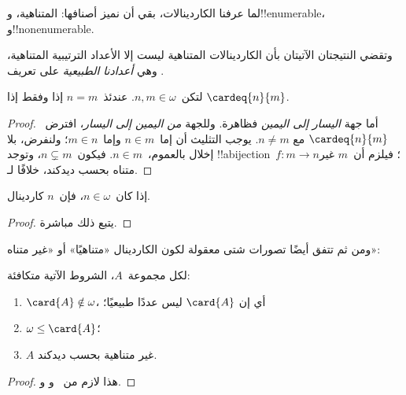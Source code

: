 \documentclass[../../../include/open-logic-section]{subfiles}
\begin{document}

لما عرفنا الكاردينالات، بقي أن نميز أصنافها: المتناهية،
و!!{enumerable}، و!!{nonenumerable}.

وتقضي النتيجتان الآتيتان بأن الكاردينالات المتناهية ليست إلا الأعداد
الترتيبية المتناهية، وهي \emph{أعدادنا الطبيعية} على تعريف
.

\begin{prop}
لتكن~$n, m \in \omega$. عندئذ~$n = m$ إذا وفقط إذا
$\cardeq{n}{m}$.
\end{prop}

\begin{proof}
أما جهة \emph{اليسار إلى اليمين} فظاهرة. وللجهة
\emph{من اليمين إلى اليسار}، افترض~$\cardeq{n}{m}$ مع
$n \neq m$. يوجب التثليث أن إما~$n \in m$ وإما~$m \in n$؛ ولنفرض،
بلا إخلال بالعموم،~$n \in m$. فيكون~$n \subsetneq m$، وتوجد
!!a{bijection}~$f \colon m \to n$؛ فيلزم أن~$m$ غير متناه بحسب
ديدكند، خلافًا لـ.
\end{proof}

\begin{cor}
إذا كان~$n \in \omega$، فإن~$n$ كاردينال.
\end{cor}

\begin{proof}
يتبع ذلك مباشرة.
\end{proof}
\noindent
ومن ثم تتفق أيضًا تصورات شتى معقولة لكون الكاردينال «متناهيًا» أو
«غير متناه»:
\begin{thm}لكل مجموعة~$A$، الشروط الآتية متكافئة:
\begin{enumerate}
	\item{} $\card{A} \notin \omega$، أي إن
	$\card{A}$ ليس عددًا طبيعيًا؛
	\item{} $\omega \leq \card{A}$؛
	\item{} $A$ غير متناهية بحسب ديدكند.
\end{enumerate}
\end{thm}

\begin{proof}
هذا لازم من~
و
و.
\end{proof}
\end{document}
